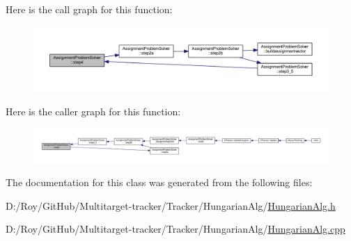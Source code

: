 Here is the call graph for this function\+:\nopagebreak
\begin{figure}[H]
\begin{center}
\leavevmode
\includegraphics[width=350pt]{class_assignment_problem_solver_a6ea85d386a136effd84c00f4e2f3cd77_cgraph}
\end{center}
\end{figure}
Here is the caller graph for this function\+:\nopagebreak
\begin{figure}[H]
\begin{center}
\leavevmode
\includegraphics[width=350pt]{class_assignment_problem_solver_a6ea85d386a136effd84c00f4e2f3cd77_icgraph}
\end{center}
\end{figure}


The documentation for this class was generated from the following files\+:\begin{DoxyCompactItemize}
\item 
D\+:/\+Roy/\+Git\+Hub/\+Multitarget-\/tracker/\+Tracker/\+Hungarian\+Alg/\mbox{\hyperlink{_hungarian_alg_8h}{Hungarian\+Alg.\+h}}\item 
D\+:/\+Roy/\+Git\+Hub/\+Multitarget-\/tracker/\+Tracker/\+Hungarian\+Alg/\mbox{\hyperlink{_hungarian_alg_8cpp}{Hungarian\+Alg.\+cpp}}\end{DoxyCompactItemize}
